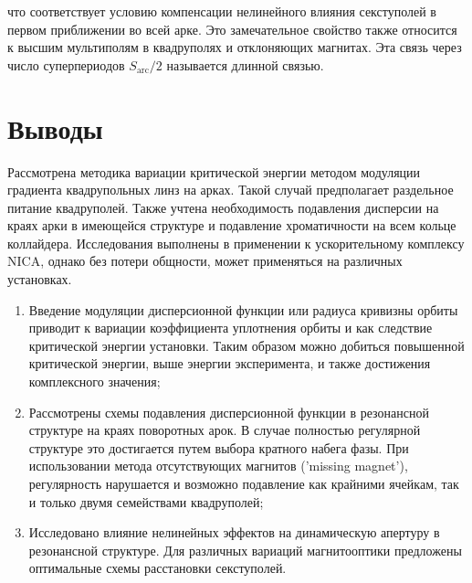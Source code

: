 \noindent что соответствует условию компенсации нелинейного влияния секступолей в первом приближении во всей арке. Это замечательное свойство также относится к высшим мультиполям в квадруполях и отклоняющих магнитах. Эта связь через число суперпериодов $S_{\text{arc}}/2$ называется длинной связью.

\section*{Выводы}
\par Рассмотрена методика вариации критической энергии методом модуляции градиента квадрупольных линз на арках. Такой случай предполагает раздельное питание квадруполей. Также учтена необходимость подавления дисперсии на краях арки в имеющейся структуре и подавление хроматичности на всем кольце коллайдера. Исследования выполнены в применении к ускорительному комплексу NICA, однако без потери общности, может применяться на различных установках.

\begin{enumerate}

\item Введение модуляции дисперсионной функции или радиуса кривизны орбиты приводит к вариации коэффициента уплотнения орбиты и как следствие критической энергии установки. Таким образом можно добиться повышенной критической энергии, выше энергии эксперимента, и также достижения комплексного значения;

\item Рассмотрены схемы подавления дисперсионной функции в резонансной структуре на краях поворотных арок. В случае полностью регулярной структуре это достигается путем выбора кратного набега фазы. При использовании метода отсутствующих магнитов ('missing magnet'), регулярность нарушается и возможно подавление как крайними ячейкам, так и только двумя семействами квадруполей;

\item Исследовано влияние нелинейных эффектов на динамическую апертуру в резонансной структуре. Для различных вариаций магнитооптики предложены оптимальные схемы расстановки секступолей.

\end{enumerate}

\FloatBarrier